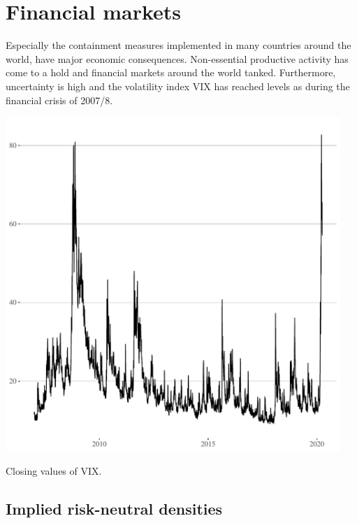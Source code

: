 \documentclass[a4paper]{tufte-handout}
\begin{document}

\section{Financial markets}

Especially the containment measures implemented in many countries
around the world, have major economic consequences. Non-essential
productive activity has come to a hold and financial markets around
the world tanked. Furthermore, uncertainty is high and the volatility
index VIX has reached levels as during the financial crisis of 2007/8.
\begin{marginfigure}
  \begin{center}
    \includegraphics[width=0.95\textwidth]{../figs/VIX.pdf}
  \end{center}
  \caption{Closing values of VIX.}
\end{marginfigure}

\subsection{Implied risk-neutral densities}
\end{document}
